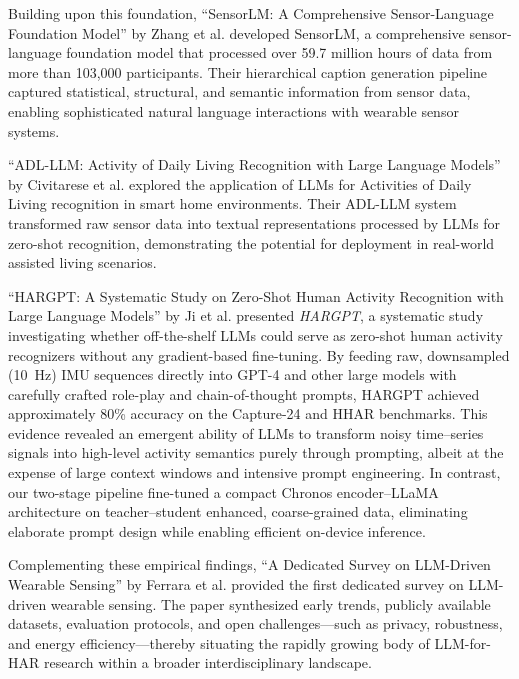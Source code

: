 Building upon this foundation, ``SensorLM: A Comprehensive Sensor-Language Foundation Model'' by Zhang et al. \cite{Zhang2025SensorLM} developed SensorLM, a comprehensive sensor-language foundation model that processed over 59.7 million hours of data from more than 103,000 participants. Their hierarchical caption generation pipeline captured statistical, structural, and semantic information from sensor data, enabling sophisticated natural language interactions with wearable sensor systems.

``ADL-LLM: Activity of Daily Living Recognition with Large Language Models'' by Civitarese et al. \cite{Civitarese2024ADLLLM} explored the application of LLMs for Activities of Daily Living recognition in smart home environments. Their ADL-LLM system transformed raw sensor data into textual representations processed by LLMs for zero-shot recognition, demonstrating the potential for deployment in real-world assisted living scenarios.

``HARGPT: A Systematic Study on Zero-Shot Human Activity Recognition with Large Language Models'' by Ji et al. \cite{Ji2024HARGPT} presented \textit{HARGPT}, a systematic study investigating whether off-the-shelf LLMs could serve as zero-shot human activity recognizers without any gradient-based fine-tuning. By feeding raw, downsampled (\SI{10}{\hertz}) IMU sequences directly into GPT-4 and other large models with carefully crafted role-play and chain-of-thought prompts, HARGPT achieved approximately 80\% accuracy on the Capture-24 and HHAR benchmarks. This evidence revealed an emergent ability of LLMs to transform noisy time–series signals into high-level activity semantics purely through prompting, albeit at the expense of large context windows and intensive prompt engineering. In contrast, our two-stage pipeline fine-tuned a compact Chronos encoder--LLaMA architecture on teacher--student enhanced, coarse-grained data, eliminating elaborate prompt design while enabling efficient on-device inference.

Complementing these empirical findings, ``A Dedicated Survey on LLM-Driven Wearable Sensing'' by Ferrara et al. \cite{Ferrara2024LLMSurvey} provided the first dedicated survey on LLM-driven wearable sensing. The paper synthesized early trends, publicly available datasets, evaluation protocols, and open challenges—such as privacy, robustness, and energy efficiency—thereby situating the rapidly growing body of LLM-for-HAR research within a broader interdisciplinary landscape.

